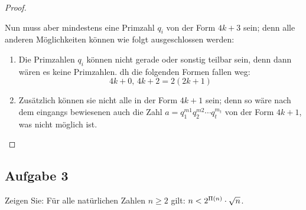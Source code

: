 \begin{proof}
\begin{enumerate}[label=\alph*)]
          Nun muss aber mindestens eine Primzahl $q_i$ von der Form $4k + 3$ sein;
          denn alle anderen Möglichkeiten können wie folgt ausgeschlossen werden:
          \begin{enumerate}
            \item Die Primzahlen $q_i$ können nicht gerade oder sonstig teilbar sein,
                  denn dann wären es keine Primzahlen.
                  \Ac{dh} die folgenden Formen fallen weg:
                  \begin{equation*}
                    4k + 0,\, 4k + 2 = 2(2k + 1)
                  \end{equation*}
            \item Zusätzlich können sie nicht alle in der Form $4k + 1$ sein; denn
                  so wäre nach dem eingangs bewiesenen auch die Zahl
                  $a = q_1^{m1}q_2^{m2} \dotsm q_t^{m_t}$ von
                  der Form $4k + 1$, was nicht möglich ist.
          \end{enumerate}
  \end{enumerate}
\end{proof}

\subsection{Aufgabe 3}
Zeigen Sie: Für alle natürlichen Zahlen $n \geq 2$ gilt:
$n < 2^{\Pi{}(n)} \cdot \sqrt{n}$.
